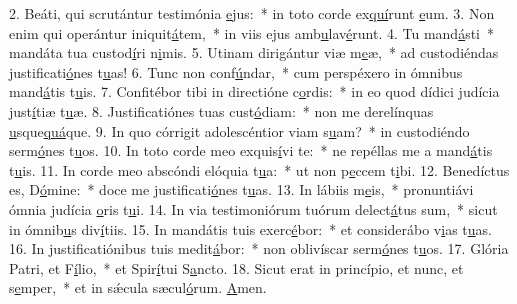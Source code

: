 2. Beáti, qui scrutántur testimónia \uline{e}jus:~* in toto corde ex\uline{quí}runt \uline{e}um.
3. Non enim qui operántur iniquit\uline{á}tem,~* in viis ejus amb\uline{u}lav\uline{é}runt.
4. Tu mand\uline{á}sti~* mandáta tua custod\uline{í}ri n\uline{i}mis.
5. Utinam dirigántur viæ m\uline{e}æ,~* ad custodiéndas justificati\uline{ó}nes t\uline{u}as!
6. Tunc non conf\uline{ú}ndar,~* cum perspéxero in ómnibus mand\uline{á}tis t\uline{u}is.
7. Confitébor tibi in directióne c\uline{o}rdis:~* in eo quod dídici judícia just\uline{í}tiæ t\uline{u}æ.
8. Justificatiónes tuas cust\uline{ó}diam:~* non me derelínquas \uline{u}sque\uline{quá}que.
9. In quo córrigit adolescéntior viam s\uline{u}am?~* in custodiéndo serm\uline{ó}nes t\uline{u}os.
10. In toto corde meo exquis\uline{í}vi te:~* ne repéllas me a mand\uline{á}tis t\uline{u}is.
11. In corde meo abscóndi elóquia t\uline{u}a:~* ut non p\uline{e}ccem t\uline{i}bi.
12. Benedíctus es, D\uline{ó}mine:~* doce me justificati\uline{ó}nes t\uline{u}as.
13. In lábiis m\uline{e}is,~* pronuntiávi ómnia judícia \uline{o}ris t\uline{u}i.
14. In via testimoniórum tuórum delect\uline{á}tus sum,~* sicut in ómnib\uline{u}s div\uline{í}tiis.
15. In mandátis tuis exerc\uline{é}bor:~* et considerábo v\uline{i}as t\uline{u}as.
16. In justificatiónibus tuis medit\uline{á}bor:~* non oblivíscar serm\uline{ó}nes t\uline{u}os.
17. Glória Patri, et F\uline{í}lio,~* et Spir\uline{í}tui S\uline{a}ncto.
18. Sicut erat in princípio, et nunc, et s\uline{e}mper,~* et in sǽcula sæcul\uline{ó}rum. \uline{A}men.

